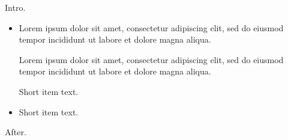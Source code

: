 \documentclass[12pt]{article}
\begin{document}
Intro.
\begin{itemize}
\item Lorem ipsum dolor sit amet, consectetur adipiscing elit, sed do eiusmod tempor incididunt ut labore et dolore magna aliqua.

Lorem ipsum dolor sit amet, consectetur adipiscing elit, sed do eiusmod tempor incididunt ut labore et dolore magna aliqua.

Short item text.
\item Short item text.
\end{itemize}
After.
\end{document}
